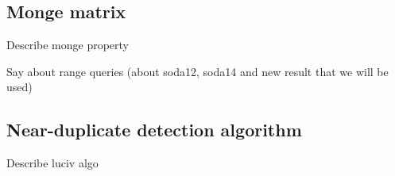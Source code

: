 \subsection{Monge matrix}
Describe monge property  


Say about range queries (about soda12, soda14 and new result that we will be used)

\subsection{Near-duplicate detection algorithm}

Describe luciv algo

